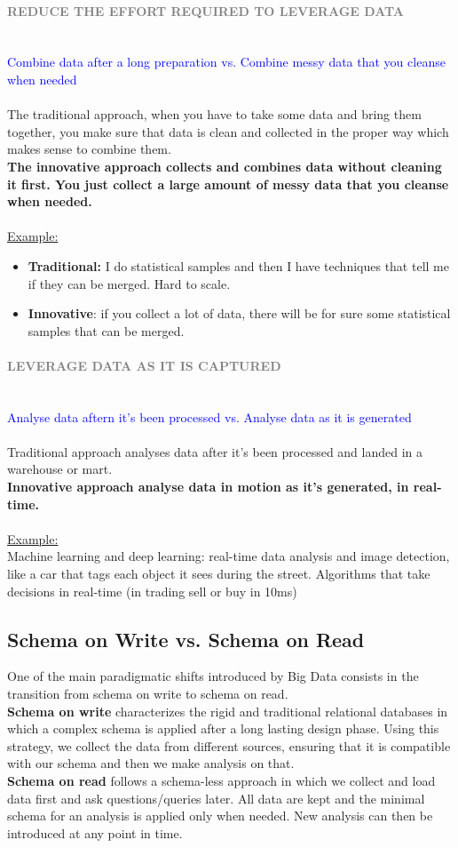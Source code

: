 \documentclass[10pt,a4paper]{article}
\newcommand{\nline}{\\~\\}
\newcommand{\myparagraph}[1]{\paragraph{\normalsize{\textcolor{gray}{\uppercase{\textbf{#1}}}} }\mbox{} \vspace{0.5em}\\}
\begin{document}
\myparagraph{Reduce the effort required to leverage data}
\textcolor{blue}{Combine data after a long preparation vs. Combine messy data that you cleanse when needed}
\nline
The traditional approach, when you have to take some data and bring them together, you make sure that data is clean and collected in the proper way which makes sense to combine them. \\
\textbf{The innovative approach collects and combines data without cleaning it first. You just collect a large amount of messy data that you cleanse when needed.} \nline
\uline{Example:}
\begin{itemize}
	\item \textbf{Traditional:} I do statistical samples and then I have techniques that tell me if they can be merged. Hard to scale.
	\item \textbf{Innovative}: if you collect a lot of data, there will be for sure some statistical samples that can be merged.
\end{itemize}

\myparagraph{Leverage data as it is captured}
\textcolor{blue}{Analyse data aftern it's been processed vs. Analyse data as it is generated}
\nline
Traditional approach analyses data after it’s been processed and landed in a warehouse or mart. \\
\textbf{Innovative approach analyse data in motion as it’s generated, in real-time.} \nline
\uline{Example:} \\
Machine learning and deep learning: real-time data analysis and image detection, like a car that tags each object it sees during the street.
Algorithms that take decisions in real-time (in trading sell or buy in 10ms) 
\subsection{Schema on Write vs. Schema on Read}
One of the main paradigmatic shifts introduced by Big Data consists in the transition from schema on write to schema on read. \\
\textbf{Schema on write} characterizes the rigid and traditional relational databases in which a complex schema is applied after a long lasting design phase. Using this strategy, we collect the data from different sources, ensuring that it is compatible with our schema and then we make analysis on that. \\
\textbf{Schema on read} follows a schema-less approach in which we collect and load data first and ask questions/queries later. All data are kept and the minimal schema for an analysis is applied only when needed. New analysis can then be introduced at any point in time.
\pagebreak
\end{document}
